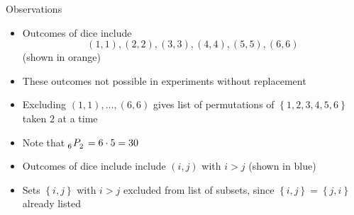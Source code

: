 \documentclass{beamer}
\theoremstyle{definition}
\newcommand\npr[2]{\tensor[_{#1}]P{_{#2}}}
\begin{document}
\begin{frame}{Observations}
\begin{itemize}
\item Outcomes of dice include
\[\left(1,1\right),\left(2,2\right),\left(3,3\right),
\left(4,4\right),\left(5,5\right),\left(6,6\right)\]
(shown in {\color{orange}orange})
\item These outcomes not possible in experiments without replacement
\item Excluding $\left(1,1\right),\ldots,\left(6,6\right)$
gives list of permutations of $\left\{1,2,3,4,5,6\right\}$
taken $2$ at a time
\item Note that $\npr{6}{2}=6\cdot 5=30$
\item Outcomes of dice include include $\left(i,j\right)$ with $i>j$
(shown in {\color{blue}blue})
\item Sets $\left\{i,j\right\}$ with $i>j$ excluded
from list of subsets, since
$\left\{i,j\right\}=\left\{j,i\right\}$ already listed
\end{itemize}
\end{frame}
\end{document}
